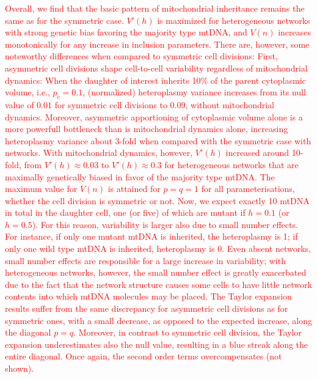 \documentclass{article}
\begin{document}
\textcolor{red}{Overall, we find that the basic pattern of mitochondrial inheritance remains the same as for the symmetric case. $V'(h)$ is maximized for heterogeneous networks with strong genetic bias favoring the majority type mtDNA, and $V(n)$ increases monotonically for any increase in inclusion parameters. There are, however, some noteworthy differences when compared to symmetric cell divisions: First, asymmetric cell divisions shape cell-to-cell variability regardless of mitochondrial dynamics: When the daughter of interest inherits 10\% of the parent cytoplasmic volume, i.e., $p_c=0.1$, (normalized) heteroplasmy variance increases from its null value of $0.01$ for symmetric cell divisions to $0.09$, without mitochondrial dynamics. Moreover, asymmetric apportioning of cytoplasmic volume alone is a more powerfull bottleneck than is mitochondrial dynamics alone, increasing heteroplasmy variance about 3-fold when compared with the symmetric case with networks. With mitochondrial dynamics, however, $V'(h)$ increased around 10-fold, from $V'(h)\approx0.03$ to $V'(h)\approx0.3$ for heterogeneous networks that are maximally genetically biased in favor of the majority type mtDNA. The maximum value for $V(n)$ is attained for $p=q=1$ for all parameterisations, whether the cell division is symmetric or not. 
Now, we expect exactly 10 mtDNA in total in the daughter cell, one (or five) of which are mutant if $h=0.1$ (or $h=0.5$). For this reason, variability is larger also due to small number effects. For instance, if only one mutant mtDNA is inherited, the heteroplasmy is 1; if only one wild type mtDNA is inherited, heteroplasmy is 0. Even absent networks, small number effects are responsible for a large increase in variability; with heterogeneous networks, however, the small number effect is greatly exacerbated due to the fact that the network structure causes some cells to have little network contents into which mtDNA molecules may be placed.
The Taylor expansion results suffer from the same discrepancy for asymmetric cell divisions as for symmetric ones, with a small decrease, as opposed to the expected increase, along the diagonal $p=q$. Moreover, in contrast to symmetric cell division, the Taylor expansion underestimates also the null value, resulting in a blue streak along the entire diagonal. Once again, the second order terms overcompensates (not shown).}
\end{document}
